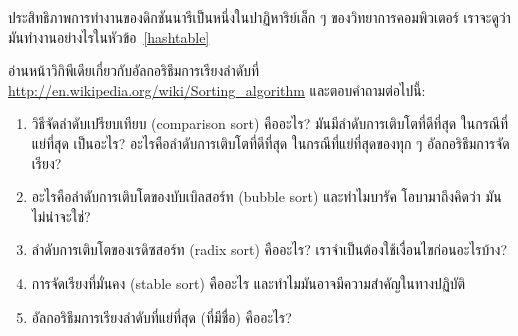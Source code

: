 ประสิทธิภาพการทำงานของดิกชันนารีเป็นหนึ่งในปาฏิหาริย์เล็ก ๆ ของวิทยาการคอมพิวเตอร์ เราจะดูว่ามันทำงานอย่างไรในหัวข้อ~\ref{hashtable}

\begin{exercise}


อ่านหน้าวิกิพีเดียเกี่ยวกับอัลกอริธึมการเรียงลำดับที่ \url{http://en.wikipedia.org/wiki/Sorting_algorithm} 
และตอบคำถามต่อไปนี้:

\begin{enumerate}

  
\item วิธีจัดลำดับเปรียบเทียบ (comparison sort) คืออะไร? มันมีลำดับการเติบโตที่ดีที่สุด ในกรณีที่แย่ที่สุด เป็นอะไร? อะไรคือลำดับการเติบโตที่ดีที่สุด ในกรณีที่แย่ที่สุดของทุก ๆ อัลกอริธึมการจัดเรียง?

\item อะไรคือลำดับการเติบโตของบับเบิลสอร์ท (bubble sort) และทำไมบารัค โอบามาถึงคิดว่า มันไม่น่าจะใช่?

\item ลำดับการเติบโตของเรดิซสอร์ท (radix sort) คืออะไร? เราจำเป็นต้องใช้เงื่อนไขก่อนอะไรบ้าง?

\item การจัดเรียงที่มั่นคง (stable sort) คืออะไร และทำไมมันอาจมีความสำคัญในทางปฏิบัติ

\item อัลกอริธึมการเรียงลำดับที่แย่ที่สุด (ที่มีชื่อ) คืออะไร?


\end{enumerate}
\end{exercise}
